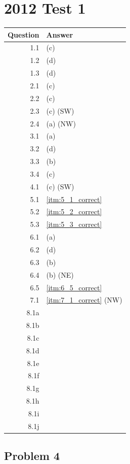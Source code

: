 \documentclass[docid=2012]{tcom_test1}
\begin{document}
\setcounter{section}{11}
\section{2012 Test 1}
\begin{center}
\begin{tabular}{r | l}
	Question & Answer   \\ \hline
	1.1      & (c)      \\
	1.2      & (d)      \\
	1.3      & (d)      \\ \hline
	2.1      & (c)      \\
	2.2      & (c)      \\
	2.3      & (c) (SW) \\
	2.4      & (a) (NW) \\ \hline
	3.1      & (a)      \\
	3.2      & (d)      \\
	3.3      & (b)      \\
	3.4      & (c)      \\ \hline
	4.1      & (c) (SW) \\ \hline
	5.1      & \ref{itm:5_1_correct} \\
	5.2      & \ref{itm:5_2_correct} \\
	5.3      & \ref{itm:5_3_correct} \\ \hline
	6.1      & (a)      \\
	6.2      & (d)      \\
	6.3      & (b)      \\
	6.4      & (b) (NE) \\
	6.5      & \ref{itm:6_5_correct} \\ \hline
	7.1      & \ref{itm:7_1_correct} (NW) \\ \hline
	8.1a     &          \\
	8.1b     &          \\
	8.1c     &          \\
	8.1d     &          \\
	8.1e     &          \\
	8.1f     &          \\
	8.1g     &          \\
	8.1h     &          \\
	8.1i     &          \\
	8.1j     &          
\end{tabular}
\end{center}
\setcounter{subsection}{3}
\subsection{Problem 4}
\end{document}
